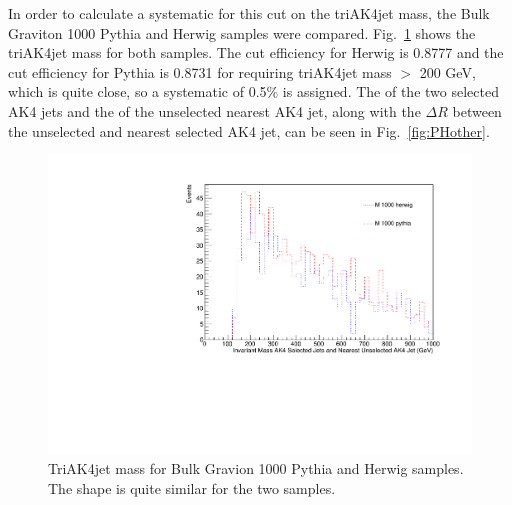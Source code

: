 In order to calculate a systematic for this cut on the triAK4jet mass, the Bulk Graviton 1000 Pythia and Herwig samples were compared. Fig.~\ref{fig:PHmass} shows the triAK4jet mass for both samples. The cut efficiency for Herwig is 0.8777 and the cut efficiency for Pythia is 0.8731 for requiring triAK4jet mass $>$ 200 GeV, which is quite close, so a systematic of 0.5\% is assigned. The \pt of the two selected AK4 jets and the \pt of the unselected nearest AK4 jet, along with the $\Delta R$ between the unselected and nearest selected AK4 jet, can be seen in Fig.~\ref{fig:PHother}.

\begin{figure}[thb!]
\begin{center}
\includegraphics[scale=0.5]{Figures/newcutinvmsnAK4cl.pdf}
\end{center}
\caption{TriAK4jet mass for Bulk Gravion 1000 Pythia and Herwig samples. The shape is quite similar for the two samples.}
\label{fig:PHmass}
\end{figure} 

